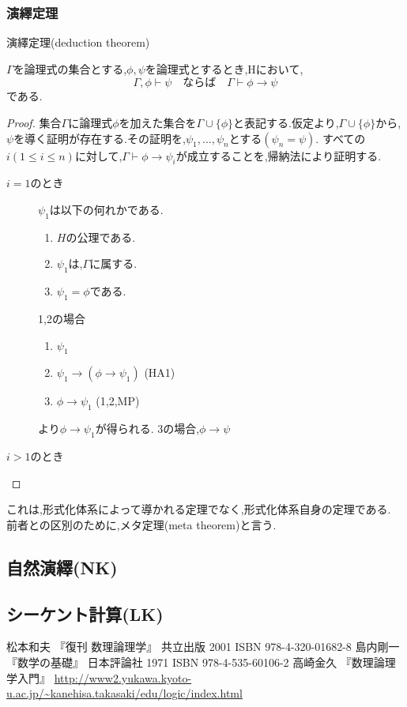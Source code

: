 \subsubsection{演繹定理}

\begin{thm}
 演繹定理(deduction theorem)

 $\Gamma$を論理式の集合とする,$\phi,\psi$を論理式とするとき,Hにおいて,
 \begin{equation*}
  \Gamma, \phi \vdash \psi \quad ならば \quad \Gamma \vdash \phi \to \psi
 \end{equation*}
 である.

\end{thm}
\begin{proof}
 集合$\Gamma$に論理式$\phi$を加えた集合を$\Gamma \cup \{\phi\}$と表記する.仮定より,$\Gamma \cup \{\phi\}$から,$\psi$を導く証明が存在する.その証明を,$\psi_1,...,\psi_n$とする$(\psi_n=\psi)$.
すべての$i(1 \leq i \leq n)$に対して,$\Gamma \vdash \phi \to \psi_i$が成立することを,帰納法により証明する.
 \begin{description}
  \item[$i=1$のとき] $\psi_1$は以下の何れかである.
			 \begin{enumerate}
			  \item $H$の公理である.
			  \item $\psi_1$は,$\Gamma$に属する.
			  \item $\psi_1=\phi$である.
			 \end{enumerate}
			 1,2の場合
			 \begin{enumerate}
			  \renewcommand{\labelenumi}{\arabic{enumi})}
			  \item $\psi_1$
			  \item $\psi_1 \to (\phi \to \psi_1)$ (HA1)
			  \item $\phi \to \psi_1$ (1,2,MP)
			 \end{enumerate}
			 より$\phi \to \psi_1$が得られる.
			 3の場合,$\phi \to \psi$
   \item[$i>1$のとき]
 \end{description}
\end{proof}
これは,形式化体系によって導かれる定理でなく,形式化体系自身の定理である.
前者との区別のために,メタ定理(meta theorem)と言う.

\subsection{自然演繹(NK)}

\subsection{シーケント計算(LK)}

\begin{thebibliography}{9}
		松本和夫 『復刊 数理論理学』 共立出版 2001 ISBN 978-4-320-01682-8
		島内剛一 『数学の基礎』 日本評論社 1971 ISBN 978-4-535-60106-2
		高崎金久 『数理論理学入門』 \url{http://www2.yukawa.kyoto-u.ac.jp/~kanehisa.takasaki/edu/logic/index.html}
\end{thebibliography}
